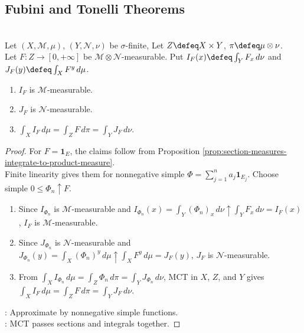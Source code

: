 \subsection{Fubini and Tonelli Theorems}

\begin{theorem} \label{thm:tonelli-sigma-finite-product-measures} \\
Let $(X,\mathcal M,\mu)$, $(Y,\mathcal N,\nu)$ be $\sigma$-finite, Let $Z\defeq X\times Y$, $\pi\defeq\mu\otimes\nu$.\\
Let $F:Z\to[0,+\infty]$ be $\mathcal M\otimes\mathcal N$-measurable. Put $I_F(x)\defeq\int_YF_x\,d\nu$ and $J_F(y)\defeq\int_XF^y\,d\mu$.
\begin{enumerate}[label=(\roman*)]
\setlength{\itemsep}{0pt}
\item $I_F$ is $\mathcal M$-measurable.
\item $J_F$ is $\mathcal N$-measurable.
\item $\int_XI_F\,d\mu=\int_ZF\,d\pi=\int_YJ_F\,d\nu$.
\end{enumerate}
\begin{proof} For $F=\mathbf{1}_E$, the claims follow from Proposition \ref{prop:section-measures-integrate-to-product-measure}.\\
Finite linearity gives them for nonnegative simple $\Phi=\sum\limits_{j=1}^na_j\mathbf{1}_{E_j}$. Choose simple $0\leq\Phi_n\uparrow F$.
\begin{enumerate}[label=(\roman*)]
\setlength{\itemsep}{0pt}
\item Since $I_{\Phi_n}$ is $\mathcal M$-measurable and $I_{\Phi_n}(x)=\int_Y(\Phi_n)_x\,d\nu\uparrow\int_YF_x\,d\nu=I_F(x)$, $I_F$ is $\mathcal M$-measurable.
\item Since $J_{\Phi_n}$ is $\mathcal N$-measurable and $J_{\Phi_n}(y)=\int_X(\Phi_n)^y\,d\mu\uparrow\int_XF^y\,d\mu=J_F(y)$, $J_F$ is $\mathcal N$-measurable.
\item From $\int_XI_{\Phi_n}\,d\mu=\int_Z\Phi_n\,d\pi=\int_YJ_{\Phi_n}\,d\nu$, MCT in $X$, $Z$, and $Y$ gives $\int_XI_F\,d\mu=\int_ZF\,d\pi=\int_YJ_F\,d\nu$.
\end{enumerate}
: Approximate by nonnegative simple functions.\\
: MCT passes sections and integrals together.
\end{proof}
\end{theorem}

